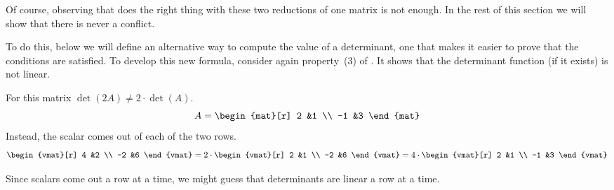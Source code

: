 Of course, observing that  does the right thing
with these two reductions of one matrix is not enough.
In the rest of this 
section we will  show that there is never a conflict.


To do this, below we will define an alternative way to compute
the value of a determinant, one that makes it easier to 
prove that the conditions are satisfied.
To develop this new formula, consider again  
property~(3) of .
It shows that the determinant function (if it exists) is not linear.

\begin{example}
For this matrix
\( \det(2A)\neq 2\cdot\det(A) \).
\begin{equation*}
   A=\begin{mat}[r]
       2  &1  \\
      -1  &3
     \end{mat}
\end{equation*} 
Instead, the scalar comes out of each of the two rows.
\begin{equation*}
   \begin{vmat}[r]
       4  &2  \\
      -2  &6
     \end{vmat}
  =2\cdot\begin{vmat}[r]
       2  &1  \\
      -2  &6
     \end{vmat}
  =4\cdot\begin{vmat}[r]
       2  &1  \\
      -1  &3
     \end{vmat}
\end{equation*}
\end{example}

Since scalars come out a row at a time, we might guess that
determinants are linear a row at a time.

